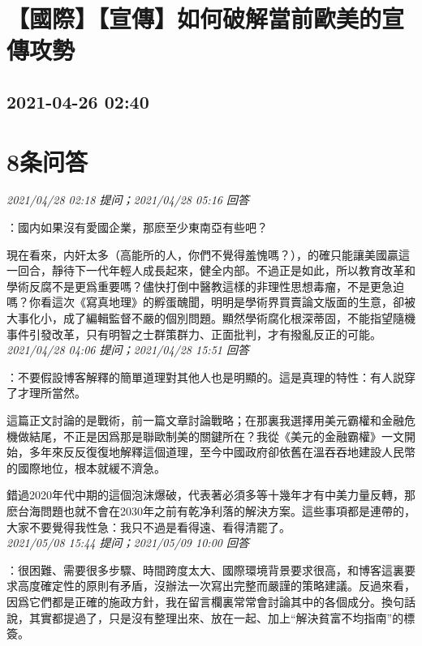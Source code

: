 \documentclass[twocolumn]{ctexart}
\begin{document}
\section{【國際】【宣傳】如何破解當前歐美的宣傳攻勢}
\subsection{2021-04-26 02:40}


\section{8条问答}

\textit{\hfill\noindent\small 2021/04/28 02:18 提问；2021/04/28 05:16 回答}

：國内如果沒有愛國企業，那麽至少東南亞有些吧？

現在看來，内奸太多（高能所的人，你們不覺得羞愧嗎？），的確只能讓美國贏這一回合，靜待下一代年輕人成長起來，健全内部。不過正是如此，所以教育改革和學術反腐不是更爲重要嗎？儘快打倒中醫教這樣的非理性思想毒瘤，不是更急迫嗎？你看這次《寫真地理》的孵蛋醜聞，明明是學術界買賣論文版面的生意，卻被大事化小，成了編輯監督不嚴的個別問題。顯然學術腐化根深蒂固，不能指望隨機事件引發改革，只有明智之士群策群力、正面批判，才有撥亂反正的可能。
\\

\textit{\hfill\noindent\small 2021/04/28 04:06 提问；2021/04/28 15:51 回答}

：不要假設博客解釋的簡單道理對其他人也是明顯的。這是真理的特性：有人説穿了才理所當然。

這篇正文討論的是戰術，前一篇文章討論戰略；在那裏我選擇用美元霸權和金融危機做結尾，不正是因爲那是聯歐制美的關鍵所在？我從《美元的金融霸權》一文開始，多年來反反復復地解釋這個道理，至今中國政府卻依舊在溫吞吞地建設人民幣的國際地位，根本就緩不濟急。

錯過2020年代中期的這個泡沫爆破，代表著必須多等十幾年才有中美力量反轉，那麽台海問題也就不會在2030年之前有乾净利落的解決方案。這些事項都是連帶的，大家不要覺得我性急：我只不過是看得遠、看得清罷了。
\\

\textit{\hfill\noindent\small 2021/05/08 15:44 提问；2021/05/09 10:00 回答}

：很困難、需要很多步驟、時間跨度太大、國際環境背景要求很高，和博客這裏要求高度確定性的原則有矛盾，沒辦法一次寫出完整而嚴謹的策略建議。反過來看，因爲它們都是正確的施政方針，我在留言欄裏常常會討論其中的各個成分。換句話說，其實都提過了，只是沒有整理出來、放在一起、加上“解決貧富不均指南”的標簽。
\end{document}
